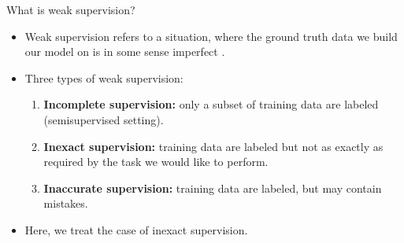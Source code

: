 \documentclass[xcolor=pdftex,dvipsnames,table]{beamer}
\begin{document}
\begin{frame}{What is weak supervision?}
\begin{itemize}
\item Weak supervision refers to a situation, where the ground truth data we build our model on is in some sense imperfect \cite{Zhou2018}. 
\item Three types of weak supervision:
\begin{enumerate}
\item \textbf{Incomplete supervision:} only a subset of training data are labeled (semisupervised setting).
\item \textbf{Inexact supervision:} training data are labeled but not as exactly as required by the task we would like to perform.
\item \textbf{Inaccurate supervision:} training data are labeled, but may contain mistakes. 
\end{enumerate}
\item Here, we treat the case of inexact supervision. 
\end{itemize}
\end{frame}
\end{document}

